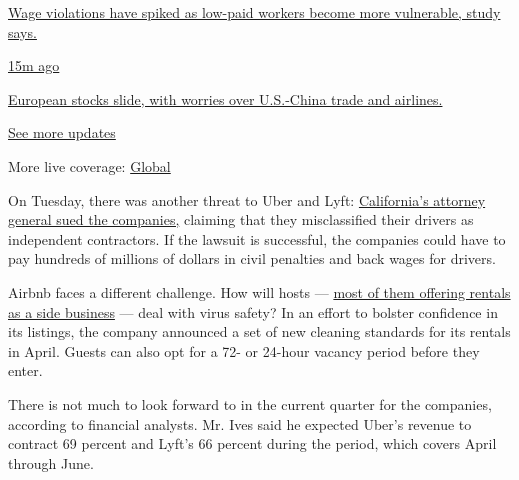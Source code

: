 \href{https://www.nytimes3xbfgragh.onion/live/2020/09/08/business/stock-market-today-coronavirus?action=click\&pgtype=Article\&state=default\&region=MAIN_CONTENT_1\&context=storylines_live_updates\#wage-violations-have-spiked-as-low-paid-workers-become-more-vulnerable-study-says}{Wage
violations have spiked as low-paid workers become more vulnerable, study
says.}

\href{https://www.nytimes3xbfgragh.onion/live/2020/09/08/business/stock-market-today-coronavirus?action=click\&pgtype=Article\&state=default\&region=MAIN_CONTENT_1\&context=storylines_live_updates\#european-stocks-slide-with-worries-over-us-china-trade-and-airlines}{15m
ago}

\href{https://www.nytimes3xbfgragh.onion/live/2020/09/08/business/stock-market-today-coronavirus?action=click\&pgtype=Article\&state=default\&region=MAIN_CONTENT_1\&context=storylines_live_updates\#european-stocks-slide-with-worries-over-us-china-trade-and-airlines}{European
stocks slide, with worries over U.S.-China trade and airlines.}

\href{https://www.nytimes3xbfgragh.onion/live/2020/09/08/business/stock-market-today-coronavirus?action=click\&pgtype=Article\&state=default\&region=MAIN_CONTENT_1\&context=storylines_live_updates}{See
more updates}

More live coverage:
\href{https://www.nytimes3xbfgragh.onion/2020/09/08/world/covid-19-coronavirus.html?action=click\&pgtype=Article\&state=default\&region=MAIN_CONTENT_1\&context=storylines_live_updates}{Global}

On Tuesday, there was another threat to Uber and Lyft:
\href{https://www.nytimes3xbfgragh.onion/2020/05/05/technology/california-uber-lyft-lawsuit.html}{California's
attorney general sued the companies,} claiming that they misclassified
their drivers as independent contractors. If the lawsuit is successful,
the companies could have to pay hundreds of millions of dollars in civil
penalties and back wages for drivers.

Airbnb faces a different challenge. How will hosts ---
\href{https://www.nytimes3xbfgragh.onion/2020/03/10/technology/airbnb-hosts-coronavirus.html}{most
of them offering rentals as a side business} --- deal with virus safety?
In an effort to bolster confidence in its listings, the company
announced a set of new cleaning standards for its rentals in April.
Guests can also opt for a 72- or 24-hour vacancy period before they
enter.

There is not much to look forward to in the current quarter for the
companies, according to financial analysts. Mr. Ives said he expected
Uber's revenue to contract 69 percent and Lyft's 66 percent during the
period, which covers April through June.


